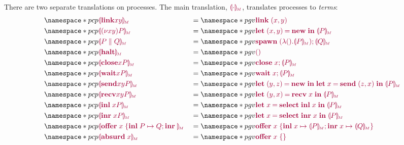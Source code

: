 \documentclass[main.tex]{subfiles}
\begin{document}
There are two separate translations on processes. The main translation, $\tm{\cpgvM{\cdot}}$, translates processes to \emph{terms}:
\begin{align*}
  &\pcp{\tm{\cpgvM{\link{x}{y}}}}
  &&= \pgv{\tm{\link\;{\pair{x}{y}}}} \\
  &\pcp{\tm{\cpgvM{\res{x}{y}{P}}}}
  &&= \pgv{\tm{\letpair{x}{y}{\new}{\cpgvM{P}}}} \\
  &\pcp{\tm{\cpgvM{\ppar{P}{Q}}}}
  &&= \pgv{\tm{\andthen{\spawn\;{(\lambda\unit.\cpgvM{P})}}{\cpgvM{Q}}}} \\
  &\pcp{\tm{\cpgvM{\halt}}}
  &&= \pgv{\tm{\unit}} \\
  &\pcp{\tm{\cpgvM{\close{x}{P}}}}
  &&= \pgv{\tm{\andthen{\close\;{x}}{\cpgvM{P}}}} \\
  &\pcp{\tm{\cpgvM{\wait{x}{P}}}}
  &&= \pgv{\tm{\andthen{\wait\;{x}}{\cpgvM{P}}}} \\
  &\pcp{\tm{\cpgvM{\send{x}{y}{P}}}}
  &&= \pgv{\tm{\letpair{y}{z}{\new}{\letbind{x}{\send\;{\pair{z}{x}}}{\cpgvM{P}}}}} \\
  &\pcp{\tm{\cpgvM{\recv{x}{y}{P}}}}
  &&= \pgv{\tm{\letpair{y}{x}{\recv\;{x}}{\cpgvM{P}}}} \\
  &\pcp{\tm{\cpgvM{\inl{x}{P}}}}
  &&= \pgv{\tm{\letbind{x}{\select{\labinl}\;{x}}{\cpgvM{P}}}} \\
  &\pcp{\tm{\cpgvM{\inr{x}{P}}}}
  &&= \pgv{\tm{\letbind{x}{\select{\labinr}\;{x}}{\cpgvM{P}}}} \\
  &\pcp{\tm{\cpgvM{\offer{x}{P}{Q}}}}
  &&= \pgv{\tm{\offer{x}{x}{\cpgvM{P}}{x}{\cpgvM{Q}}}} \\
  &\pcp{\tm{\cpgvM{\absurd{x}}}}
  &&= \pgv{\tm{\offeremp{x}}}
\end{align*}
\end{document}
